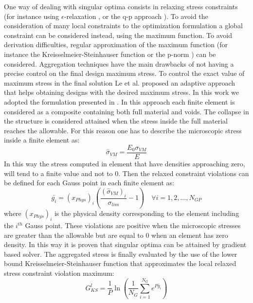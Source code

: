 One way of dealing with singular optima consists in relaxing stress constraints (for instance using $\epsilon$-relaxation \cite{cheng1997varepsilon}, or the q-p approach \cite{bruggi2008alternative}). To avoid the consideration of many local constraints to the optimization formulation a global constraint can be considered instead, using the maximum function.  To avoid derivation difficulties, regular approximation of the maximum function (for instance the Kreisselmeier-Steinhauser
function \cite{kreisselmeier1980systematic,yang1996stress} or the p-norm \cite{duysinx1998new} ) can be considered. Aggregation techniques have the main drawbacks of not having a precise control on the final design maximum stress. To control the exact value of maximum stress in the final solution Le et al. \cite{le2010stress} proposed an adaptive approach that helps obtaining designs with the desired maximum stress.  In this work we adopted the formulation presented in \cite{verbart2017unified}.
In this approach each finite element is considered as a composite containing both full material and voids. The collapse in the structure is considered attained when the stress inside the full material reaches the allowable. For this reason one has to describe the microscopic stress inside a finite element as:
\begin{equation}
\hat{\sigma}_{VM}=\frac{E_0\sigma_{VM}}{E}
\end{equation}
In this way the stress computed in element that have densities approaching zero, will tend to a finite value and not to 0. Then the relaxed constraint violations can be defined for each Gauss point in each finite element as:
\begin{equation}
\label{eq.2.30}
\bar{g_i}=(x_{Phys})_i\left(\frac{(\hat{\sigma}_{VM})_i}{\sigma_{lim}}-1\right) \quad \forall i=1,2,...,N_{GP}
\end{equation}
where $(x_{Phys})_i$ is the physical density corresponding to the element including the $i^{th}$ Gauss point.
These violations are positive when the microscopic stresses are greater than the allowable but are equal to 0 when an element has zero density. In this way it is proven that singular optima can be attained by gradient based solver.
The aggregated stress is finally evaluated by the use of the lower bound Kreisselmeier-Steinhauser
function \cite{kreisselmeier1980systematic} that approximates the local relaxed stress constraint violation maximum:
\begin{equation}
\label{e.KSl}
G^{l}_{KS}=\frac{1}{P}\ln\left(\frac{1}{N_G}\sum_{i=1}^{N_G}e^{P\bar{g}_i}\right)
\end{equation}
